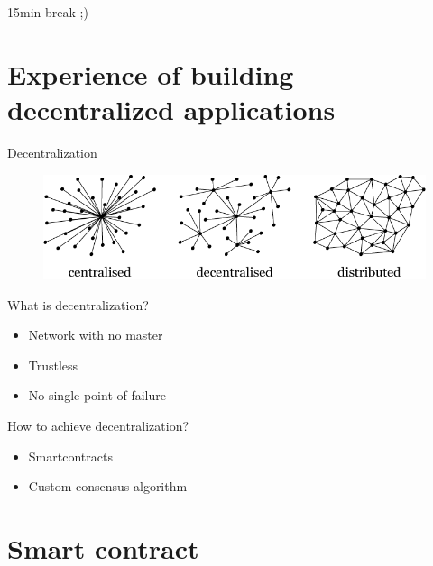 \documentclass[12pt]{beamer}
\begin{document}
  \begin{frame}[standout]
    15min break ;)
  \end{frame}

  \section{Experience of building decentralized applications}

  \begin{frame}{Decentralization}
    \begin{figure}
      \includegraphics[height=.35\textheight]{images/centralised-decentralised-distributed}
    \end{figure}
  \end{frame}

  \begin{frame}{What is decentralization?}
    \begin{itemize}
      \item Network with \alert{no master}
      \pause
      \item \alert{Trustless}
      \pause
      \item No single point of failure
    \end{itemize}
  \end{frame}


  \begin{frame}{How to achieve decentralization?}
    \begin{itemize}
      \item \alert{Smartcontracts}
      \pause
      \item Custom \alert{consensus} algorithm
    \end{itemize}
  \end{frame}




  \section{Smart contract}
\end{document}
